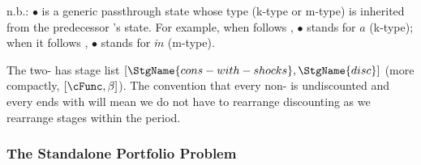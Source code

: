 \documentclass[titlepage, headings=optiontotocandhead]{econark}
\begin{document}
\begin{table}[h]\caption{Discounting {\Stg} ($\beta$) {\Prchs}}\label{tab:prchs-disc}
\newsavebox{\disctablebox}%
\begin{center}
    \usebox{\disctablebox}

    \parbox{\wd\disctablebox}{\footnotesize n.b.: $\bullet$ is a generic passthrough state whose type (k-type or m-type) is inherited from the predecessor {\stg}'s {\Continuation} state.  For example, when  follows , $\bullet$ stands for $a$ (k-type); when it follows , $\bullet$ stands for $\check{m}$ (m-type).}
  \end{center}
  \end{table}


  The two-{\stg} {\interval} has stage list $[\StgName{cons-with-shocks}, \StgName{disc}]$ (more compactly, $[\cFunc, \beta]$).  The convention that every non- {\stg} is undiscounted and every {\interval} ends with  will mean we do not have to rearrange discounting as we rearrange stages within the period.

\hypertarget{standalone-portfolio-problem}{}
\subsubsection{The Standalone Portfolio Problem}\label{subsec:MCTheory}
\end{document}
